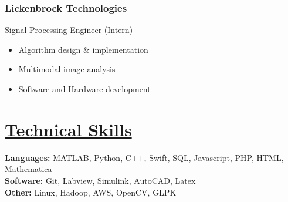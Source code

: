 \documentclass[12pt]{article}
\begin{document}
\subsubsection*{\textbf{Lickenbrock Technologies}}
Signal Processing Engineer (Intern)
\begin{itemize}[topsep=0pt,itemsep=-1ex,partopsep=1ex,parsep=1ex]
	\item Algorithm design \& implementation
	\item Multimodal image analysis
	\item Software and Hardware development
\end{itemize}
\section*{\underline{Technical Skills}}
\textbf{Languages:} MATLAB, Python, C++, Swift, SQL, Javascript, PHP, HTML, Mathematica \\
\textbf{Software:}  Git, Labview, Simulink, AutoCAD, Latex\\
\textbf{Other:} Linux, Hadoop, AWS, OpenCV, GLPK
\end{document}
